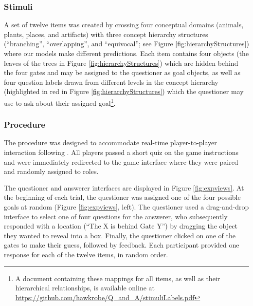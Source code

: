 \documentclass[12pt, floatsintext, jou]{apa6}
\begin{document}
\subsubsection{Stimuli} 
A set of twelve items was created by crossing four conceptual domains (animals, plants, places, and artifacts) with three concept hierarchy structures (``branching'', ``overlapping'', and ``equivocal''; see Figure \ref{fig:hierarchyStructures}) where our models make different predictions. Each item contains four objects (the leaves of the trees in Figure \ref{fig:hierarchyStructures}) which are hidden behind the four gates and may be assigned to the questioner as goal objects, as well as four question labels drawn from different levels in the concept hierarchy (highlighted in red in Figure \ref{fig:hierarchyStructures}) which the questioner may use to ask about their assigned goal\footnote{A document containing these mappings for all items, as well as their hierarchical relationships, is available online at \scriptsize\url{https://github.com/hawkrobe/Q\_and\_A/stimuliLabels.pdf}}.

\subsubsection{Procedure}

The procedure was designed to accommodate real-time player-to-player interaction following . All players passed a short quiz on the game instructions and were immediately redirected to the game interface where they were paired and randomly assigned to roles. %

The questioner and answerer interfaces are displayed in Figure \ref{fig:expviews}. %
At the beginning of each trial, the questioner was assigned one of the four possible goals at random (Figure \ref{fig:expviews}, left). The questioner used a drag-and-drop interface to select one of four questions for the answerer, who subsequently responded with a location (``The X is behind Gate Y'') by dragging the object they wanted to reveal into a box. Finally, the questioner clicked on one of the gates to make their guess, followed by feedback. 
Each participant provided one response for each of the twelve items, in random order.
\end{document}
